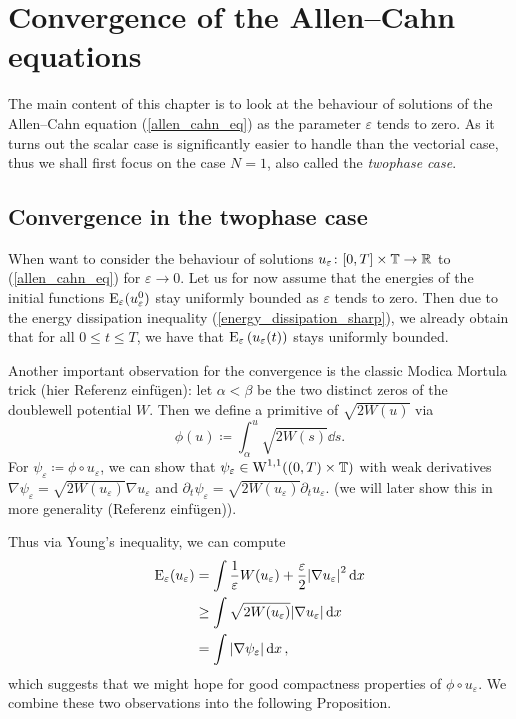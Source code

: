 \chapter{Convergence of the Allen--Cahn equations}

The main content of this chapter is to look at the behaviour of solutions of the Allen--Cahn equation (\ref{allen_cahn_eq}) as the parameter $ \varepsilon $ tends to zero. As it turns out the scalar case is significantly easier to handle than the vectorial case, thus we shall first focus on the case $ N = 1 $,
also called the \emph{twophase case}.

\section{Convergence in the twophase case}

When want to consider the behaviour of solutions $ u_{ \varepsilon} \colon [0, T] \times \operatorname{\mathbb{T}} \to \mathbb{ R } $ to (\ref{allen_cahn_eq}) for $ \varepsilon \to 0 $. Let us for now assume that the energies of the initial functions $ \operatorname{E}_{ \varepsilon } ( u_{ \varepsilon }^{ 0 } ) $ stay uniformly bounded as $ \varepsilon $ tends to zero. 
Then due to the energy dissipation inequality (\ref{energy_dissipation_sharp}), we already obtain that for all
$ 0 \leq t \leq T $, we have that $ \operatorname{E}_{ \varepsilon } \left( u_{\varepsilon } ( t ) \right) $ stays uniformly  bounded.

Another important observation for the convergence is the classic Modica Mortula trick (hier Referenz einfügen): let $ \alpha < \beta $ be the two distinct zeros of the doublewell potential $ W $.
Then we define a primitive of $ \sqrt{ 2 W ( u ) } $ via
\begin{equation*}
	\phi ( u ) 
	\coloneqq
	\int_{ \alpha }^{ u }
		\sqrt{ 2 W ( s ) }
	\dd{ s }.
\end{equation*}
For $ \psi_{ \varepsilon } \coloneqq \phi \circ u_{ \varepsilon } $, we can show that $ \psi_{ \varepsilon } \in \operatorname{W}^{ 1, 1 } ( ( 0 , T ) \times \operatorname{\mathbb{T}} ) $ with weak derivatives $ \nabla \psi_{ \varepsilon } = \sqrt{ 2 W ( u_{ \varepsilon } ) } \nabla u_{ \varepsilon } $ and $ \partial_{ t } \psi_{ \varepsilon } = \sqrt{ 2 W ( u_{ \varepsilon } ) } \partial_{ t } u_{ \varepsilon } $. (we will later show this in more generality (Referenz einfügen)).

Thus via Young's inequality, we can compute
\begin{align}
	\operatorname{E}_{ \varepsilon } ( u_{ \varepsilon } )
	& =
	\int
		\frac{ 1 }{ \varepsilon }
		W ( u_{ \varepsilon } ) 
		+
		\frac{ \varepsilon }{ 2 }
		\abs{ \nabla u_{ \varepsilon } }^{ 2 }
	\dd{ x }
	\notag
	\\
	& \geq
	\int
		\sqrt{ 2 W ( u_{ \varepsilon } ) }
		\abs{ \nabla u_{ \varepsilon } }
	\dd{ x }
	\notag
	\\
	& =
	\int
		\abs{ \nabla \psi_{ \varepsilon} }
	\dd{ x }
	\label{modica_mortula_trick},
\end{align}
which suggests that we might hope for good compactness properties of $ \phi \circ u_{ \varepsilon } $.
We combine these two observations into the following Proposition.

